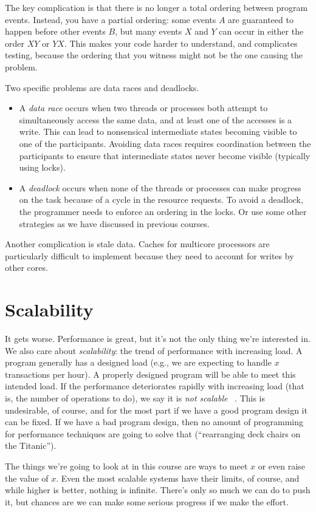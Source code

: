 The key complication is that there is no longer a total ordering between
program events. Instead, you have a partial ordering: some events $A$
are guaranteed to happen before other events $B$, but many events $X$ 
and $Y$ can occur in either the order $XY$ or $YX$. This makes your code
harder to understand, and complicates testing, because the ordering that
you witness might not be the one causing the problem.

Two specific problems are data races and deadlocks. 
\begin{itemize}
\item A
\emph{data race} occurs when two threads or processes both attempt to
simultaneously access the same data, and at least one of the accesses
is a write. This can lead to nonsensical intermediate states becoming
visible to one of the participants. Avoiding data races requires
coordination between the participants to ensure that intermediate
states never become visible (typically using locks). 
\item A \emph{deadlock}
occurs when none of the threads or processes can make progress on the
task because of a cycle in the resource requests. To avoid a deadlock,
the programmer needs to enforce an ordering in the locks. Or use some other strategies as we have discussed in previous courses.
\end{itemize}

Another complication is stale data. Caches for multicore processors
are particularly difficult to implement because they need to account
for writes by other cores.

\section*{Scalability}

It gets worse. Performance is great, but it's not the only thing we're interested in. We also care about \textit{scalability}: the trend of performance with increasing load. A program generally has a designed load (e.g., we are expecting to handle $x$ transactions per hour). A properly designed program will be able to meet this intended load. If the performance deteriorates rapidly with increasing load (that is, the number of operations to do), we say it is \textit{not scalable} ~\cite{swps}. This is undesirable, of course, and for the most part if we have a good program design it can be fixed. If we have a bad program design, then no amount of programming for performance techniques are going to solve that (``rearranging deck chairs on the Titanic'').

The things we're going to look at in this course are ways to meet $x$ or even raise the value of $x$. Even the most scalable systems have their limits, of course, and while higher is better, nothing is infinite. There's only so much we can do to push it, but chances are we can make some serious progress if we make the effort.




